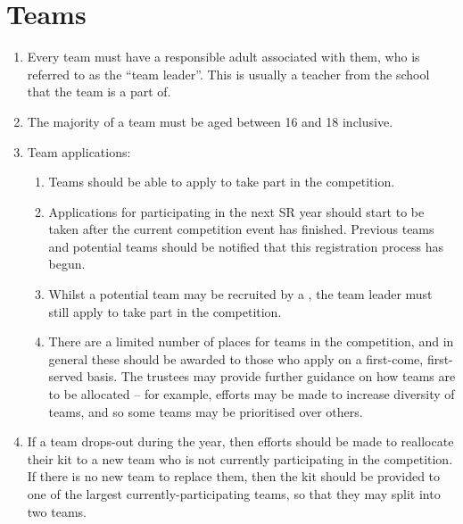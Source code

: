 \section{Teams}

\begin{enumerate}

\item Every team must have a responsible adult associated with them, who is referred to as the ``team leader''.  This is usually a teacher from the school that the team is a part of.

\item The majority of a team must be aged between 16 and 18 inclusive.

\item Team applications:

  \begin{enumerate}
  \item Teams should be able to apply to take part in the competition.
  \item Applications for participating in the next SR year should start to be taken after the current competition event has finished.  Previous teams and potential teams should be notified that this registration process has begun.
  \item Whilst a potential team may be recruited by a , the team leader must still apply to take part in the competition.
  \item There are a limited number of places for teams in the competition, and in general these should be awarded to those who apply on a first-come, first-served basis.  The trustees may provide further guidance on how teams are to be allocated -- for example, efforts may be made to increase diversity of teams, and so some teams may be prioritised over others.

  \end{enumerate}

\item If a team drops-out during the year, then efforts should be made to reallocate their kit to a new team who is not currently participating in the competition.  If there is no new team to replace them, then the kit should be provided to one of the largest currently-participating teams, so that they may split into two teams.

\end{enumerate}
